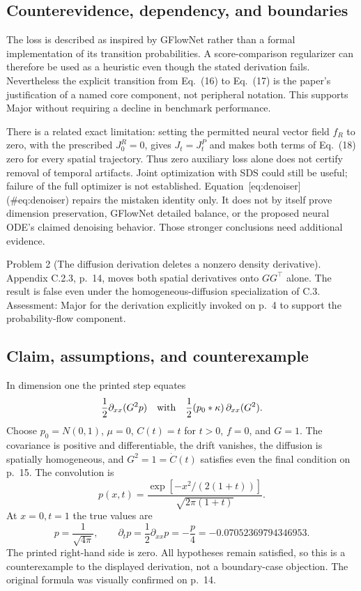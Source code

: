 \documentclass[10pt]{article}
\begin{document}
\subsection*{Counterevidence, dependency, and boundaries}
The loss is described as inspired by GFlowNet rather than a formal implementation of its transition probabilities. A score-comparison regularizer can therefore be used as a heuristic even though the stated derivation fails. Nevertheless the explicit transition from Eq. (16) to Eq. (17) is the paper’s justification of a named core component, not peripheral notation. This supports Major without requiring a decline in benchmark performance.\par
There is a related exact limitation: setting the permitted neural vector field \(f_R\) to zero, with the prescribed \(J_0^R=0\), gives \(J_t=J_t^P\) and makes both terms of Eq. (18) zero for every spatial trajectory. Thus zero auxiliary loss alone does not certify removal of temporal artifacts. Joint optimization with SDS could still be useful; failure of the full optimizer is not established. Equation [eq:denoiser] (\#eq:denoiser) repairs the mistaken identity only. It does not by itself prove dimension preservation, GFlowNet detailed balance, or the proposed neural ODE’s claimed denoising behavior. Those stronger conclusions need additional evidence.\par
Problem 2 (The diffusion derivation deletes a nonzero density derivative).  Appendix C.2.3, p. 14, moves both spatial derivatives onto \(GG^\top\) alone. The result is false even under the homogeneous-diffusion specialization of C.3. Assessment: Major for the derivation explicitly invoked on p. 4 to support the probability-flow component.\par
\subsection*{Claim, assumptions, and counterexample}
In dimension one the printed step equates \[\frac12\partial_{xx}(G^2p)
 \quad\hbox{with}\quad
 \frac12(p_0*\kappa)\,\partial_{xx}(G^2).\] Choose \(p_0=N(0,1)\), \(\mu=0\), \(C(t)=t\) for \(t>0\), \(f=0\), and \(G=1\). The covariance is positive and differentiable, the drift vanishes, the diffusion is spatially homogeneous, and \(G^2=1=\dot C(t)\) satisfies even the final condition on p. 15. The convolution is \[p(x,t)=\frac{\exp[-x^2/(2(1+t))]}{\sqrt{2\pi(1+t)}}.\] At \(x=0,t=1\) the true values are \[p=\frac1{\sqrt{4\pi}},\qquad
 \partial_t p=\frac12\partial_{xx}p=-\frac{p}{4}
 =-0.07052369794346953.\] The printed right-hand side is zero. All hypotheses remain satisfied, so this is a counterexample to the displayed derivation, not a boundary-case objection. The original formula was visually confirmed on p. 14.\par
\end{document}

